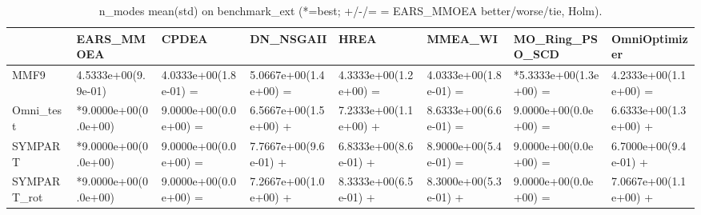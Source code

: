 \begin{table}[t]
\centering
\caption{n_modes mean(std) on benchmark_ext (*=best; +/-/= = EARS_MMOEA better/worse/tie, Holm).}
\label{tab:benchmark_ext_n_modes}
\begin{tabular}{llllllll}
\toprule
 & EARS\_MMOEA & CPDEA & DN\_NSGAII & HREA & MMEA\_WI & MO\_Ring\_PSO\_SCD & OmniOptimizer \\
\midrule
MMF9 & 4.5333e+00(9.9e-01) & 4.0333e+00(1.8e-01) = & 5.0667e+00(1.4e+00) = & 4.3333e+00(1.2e+00) = & 4.0333e+00(1.8e-01) = & *5.3333e+00(1.3e+00) = & 4.2333e+00(1.1e+00) = \\
Omni\_test & *9.0000e+00(0.0e+00) & 9.0000e+00(0.0e+00) = & 6.5667e+00(1.5e+00) + & 7.2333e+00(1.1e+00) + & 8.6333e+00(6.6e-01) = & 9.0000e+00(0.0e+00) = & 6.6333e+00(1.3e+00) + \\
SYMPART & *9.0000e+00(0.0e+00) & 9.0000e+00(0.0e+00) = & 7.7667e+00(9.6e-01) + & 6.8333e+00(8.6e-01) + & 8.9000e+00(5.4e-01) = & 9.0000e+00(0.0e+00) = & 6.7000e+00(9.4e-01) + \\
SYMPART\_rot & *9.0000e+00(0.0e+00) & 9.0000e+00(0.0e+00) = & 7.2667e+00(1.0e+00) + & 8.3333e+00(6.5e-01) + & 8.3000e+00(5.3e-01) + & 9.0000e+00(0.0e+00) = & 7.0667e+00(1.1e+00) + \\
\bottomrule
\end{tabular}
\end{table}

